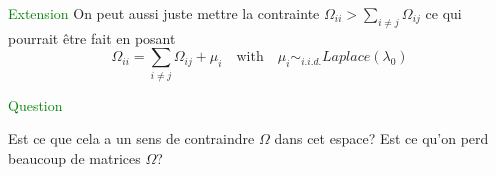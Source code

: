 \documentclass[10pt]{article}
\begin{document}
\textcolor{green}{Extension}
On peut aussi juste mettre la contrainte  $\Omega_{ii} > \sum_{i\neq j } \Omega_{ij} $ ce qui pourrait être fait en posant 
$$\Omega_{ii}  = \sum_{i\neq j } \Omega_{ij}  + \mu_i  \quad \mbox{with} \quad \mu_i \sim_{i.i.d.}  Laplace(\lambda_0)$$ 


\textcolor{green}{Question}

Est ce que cela a  un sens de contraindre $\Omega$ dans cet espace?  Est ce qu'on perd beaucoup de matrices $\Omega$?  






  
 
\end{document}
